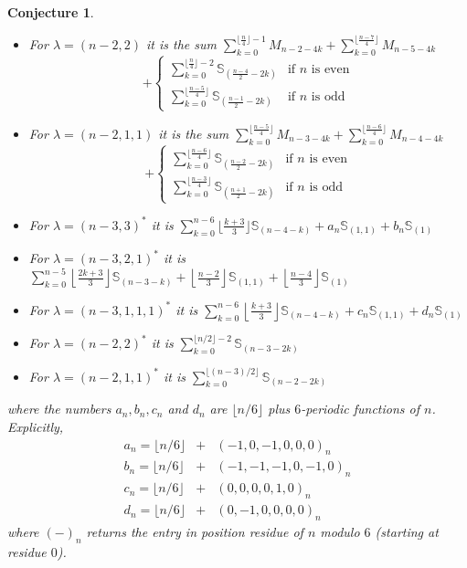 \documentclass[12pt]{article}
\newcommand{\TransposePartition}[1]{{#1}^{\ast}}
\newcommand{\Schur}[1]{\mathbb{S}_{#1}}
\newcommand{\MultTriv}[1]{M_{#1}}
\theoremstyle{plain}
\newtheorem{conj}[thm]{Conjecture}
\theoremstyle{definition}
\theoremstyle{remark}
\begin{document}
\begin{conj}
\begin{itemize}
    \item For $\lambda = (n-2,2)$ it is the sum $\sum_{k=0}^{\lfloor{\frac{n}{4}}\rfloor - 1}{\MultTriv{n-2-4k}} + \sum_{k=0}^{\lfloor{\frac{n-7}{4}}\rfloor}{\MultTriv{n-5-4k}}$
    \[ + \left\{\begin{array}{ll}
        \sum_{k=0}^{\lfloor{\frac{n}{4}}\rfloor-2}\Schur{{\left(\frac{n-4}{2} - 2k\right)}} & \text{if } n \text{ is even} \\
        \sum_{k=0}^{\lfloor{\frac{n-5}{4}}\rfloor}\Schur{{\left(\frac{n-1}{2} - 2k\right)}} & \text{if } n \text{ is odd}
    \end{array}\right.\]
    \item For $\lambda = (n-2,1,1)$ it is the sum $\sum_{k=0}^{\lfloor{\frac{n-5}{4}}\rfloor}{\MultTriv{n-3-4k}} + \sum_{k=0}^{\lfloor{\frac{n-6}{4}}\rfloor}{\MultTriv{n-4-4k}}$
    \[ + \left\{\begin{array}{ll}
        \sum_{k=0}^{\lfloor{\frac{n-6}{4}}\rfloor}\Schur{{\left(\frac{n-2}{2} - 2k\right)}} & \text{if } n \text{ is even} \\
        \sum_{k=0}^{\lfloor{\frac{n-3}{4}}\rfloor}\Schur{{\left(\frac{n+1}{2} - 2k\right)}} & \text{if } n \text{ is odd}
    \end{array}\right.\]
    \item For $\lambda = \TransposePartition{(n-3,3)}$ it is $\sum_{k=0}^{n-6}{\lfloor{\frac{k+3}{3}}\rfloor \Schur{{(n-4-k)}}} + a_n \Schur{{(1,1)}} + b_n\Schur{{(1)}}$
    \item For $\lambda = \TransposePartition{(n-3,2,1)}$ it is $\sum_{k=0}^{n-5}{\left\lfloor{\frac{2k+3}{3}}\right\rfloor\Schur{{(n-3-k)}}} + \left\lfloor{\frac{n-2}{3}}\right\rfloor\Schur{{(1,1)}} + \left\lfloor{\frac{n-4}{3}}\right\rfloor\Schur{{(1)}}$
    \item For $\lambda = \TransposePartition{(n-3,1,1,1)}$ it is $\sum_{k=0}^{n-6}{\left\lfloor{\frac{k+3}{3}}\right\rfloor\Schur{{(n-4-k)}}} + c_n \Schur{{(1,1)}} + d_n \Schur{{(1)}}$
    
        \item For $\lambda = \TransposePartition{(n-2,2)}$ it is $\sum_{k=0}^{\lfloor{n/2}\rfloor-2}{\Schur{{(n-3-2k)}}}$
    \item For $\lambda = \TransposePartition{(n-2,1,1)}$ it is $\sum_{k=0}^{\lfloor{(n-3)/2}\rfloor}{\Schur{{(n-2-2k)}}}$

\end{itemize}
where the numbers $a_n, b_n, c_n$ and $d_n$ are $\lfloor{n/6}\rfloor$ plus $6$-periodic functions of $n$. Explicitly,
\begin{eqnarray*}
a_n = \lfloor{n/6}\rfloor & + &(-1, 0 ,-1, 0 , 0 , 0 )_n \\
b_n = \lfloor{n/6}\rfloor &+& (-1, -1, -1, 0 ,-1, 0)_n \\
c_n = \lfloor{n/6}\rfloor &+& (0 , 0 , 0 , 0 , 1 , 0 )_n \\
d_n = \lfloor{n/6}\rfloor &+& (0 , -1, 0,0,0,0)_n
\end{eqnarray*}
where $(-)_n$ returns the entry in position residue of $n$ modulo $6$ (starting at residue $0$).
\end{conj}
\end{document}
